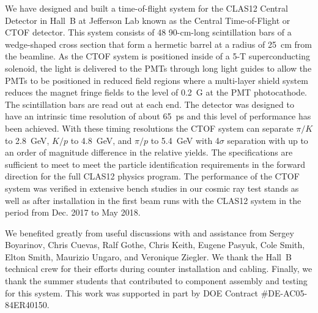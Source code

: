 \documentclass{elsart}
\begin{document}
We have designed and built a time-of-flight system for the CLAS12 Central Detector in Hall~B 
at Jefferson Lab known as the Central Time-of-Flight or CTOF detector. This system consists 
of 48 90-cm-long scintillation bars of a wedge-shaped cross section that form a hermetic barrel
at a radius of 25~cm from the beamline. As the CTOF system is positioned inside of a 5-T
superconducting solenoid, the light is delivered to the PMTs through long light guides to allow the
PMTs to be positioned in reduced field regions where a multi-layer shield system reduces the
magnet fringe fields to the level of 0.2~G at the PMT photocathode. The scintillation bars are read
out at each end. The detector was designed to have an intrinsic time resolution of about 65~ps and
this level of performance has been achieved. With these timing resolutions the CTOF system can
separate $\pi/K$ to 2.8~GeV, $K/p$ to 4.8~GeV, and $\pi/p$ to 5.4~GeV with 4$\sigma$ separation
with up to an order of magnitude difference in the relative yields.  The specifications are sufficient to
meet to meet the particle identification requirements in the forward direction for the full CLAS12
physics program. The performance of the CTOF system was verified in extensive bench studies in our
cosmic ray test stands as well as after installation in the first beam runs with the CLAS12 system in
the period from Dec. 2017 to May 2018. 

\ack

We benefited greatly from useful discussions with and assistance from Sergey Boyarinov, Chris Cuevas,
Ralf Gothe, Chris Keith, Eugene Pasyuk, Cole Smith, Elton Smith, Maurizio Ungaro, and Veronique Ziegler.
We thank the Hall~B technical crew for their efforts during counter installation and cabling. Finally, we
thank the summer students that contributed to component assembly and testing for this system.
This work was supported in part by DOE Contract \#DE-AC05-84ER40150.

\newpage
\end{document}
